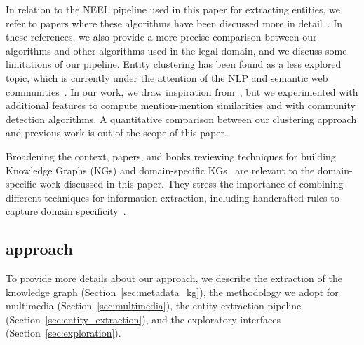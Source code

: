 In relation to the NEEL pipeline used in this paper for extracting entities, 
we refer to papers where these algorithms have been discussed more in detail~\cite{ijckg2022,aixia_2023}. In these references, we also provide a more precise comparison between our algorithms and other algorithms used in the legal domain, and we discuss some limitations of our pipeline. 
Entity clustering has been found as a less explored topic, which is currently under the attention of the NLP and semantic web communities~\cite{streaming_crossdoc_coreference,Heist2023nastylinker,kassner-etal-2022-edin}. In our work, we draw inspiration from~\cite{kassner-etal-2022-edin}, but we experimented with additional features to compute mention-mention similarities and with community detection algorithms. A quantitative comparison between our clustering approach and previous work is out of the scope of this paper. 

Broadening the context, papers, and books reviewing techniques for building Knowledge Graphs (KGs) and domain-specific KGs~\cite{weikum2021machine,ZhaoMultisourceFusion,KejriwalBook} are relevant to the domain-specific work discussed in this paper. They stress the importance of combining different techniques for information extraction, including handcrafted rules to capture domain specificity~\cite{weikum2021machine}. 

\subsection{approach}


To provide more details about our approach, we describe the extraction of the knowledge graph (Section~\ref{sec:metadata_kg}), the methodology we adopt for multimedia (Section~\ref{sec:multimedia}), the entity extraction pipeline (Section~\ref{sec:entity_extraction}), and the exploratory interfaces (Section~\ref{sec:exploration}).


